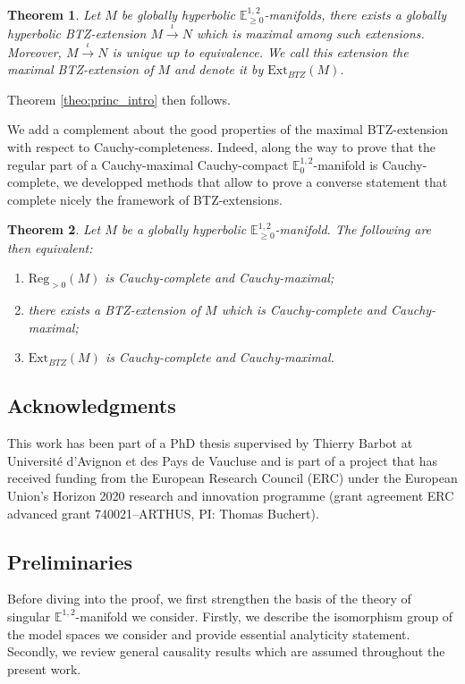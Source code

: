 \documentclass[a4paper,12pt]{article}
\newcommand{\mass}[1]{{\mathbb E}^{1,2}_{#1}}
\def\Reg{\mathrm{Reg}}
\def\BTZext{\mathrm{Ext}_{BTZ}}
\def\reg{\Reg}
\newtheorem{theo}{Theorem}    %
\begin{document}
 \begin{theo}\label{btzthm:globally_hyperbolic_manifolds_exists} Let $M$ be globally hyperbolic $\mass{\geq 0}$-manifolds, there exists a globally hyperbolic BTZ-extension $M\xrightarrow{\iota} N$ which is maximal among such extensions. Moreover, $M\xrightarrow{\iota}N$ is unique up to equivalence. We  call this extension
the maximal BTZ-extension of $M$ and denote it by 
  $\mathrm{Ext}_{BTZ}(M)$.   
\end{theo}
 Theorem \ref{theo:princ_intro} then follows. 

We add a complement about the good properties of the maximal BTZ-extension with respect to Cauchy-completeness. Indeed, along the way to prove that the regular part of a Cauchy-maximal Cauchy-compact $\mass{0}$-manifold is Cauchy-complete, we developped methods that allow to prove a converse statement that complete nicely the framework of BTZ-extensions. 

	\begin{theo}\label{btzthm:BTZ_Cauchy-completness_intro} \label{theo:BTZ_Cauchy-completness_intro}
				Let $M$ be a globally hyperbolic $\mass{\geq0}$-manifold. The following are then equivalent:			
				\begin{enumerate}
				\item $\reg_{>0}(M)$ is Cauchy-complete and Cauchy-maximal;
				\item there exists a BTZ-extension of $M$ which is Cauchy-complete and Cau\-chy-maximal;
				\item $\BTZext(M)$ is Cauchy-complete and Cauchy-maxi\-mal.
				\end{enumerate}
				\end{theo}

\subsection{Acknowledgments}
This work has been part of a PhD thesis supervised by Thierry Barbot  at Université d'Avignon et des Pays de Vaucluse and is part of a project that has received funding from the European Research Council (ERC) under the European Union's Horizon 2020 research and innovation programme (grant agreement ERC advanced grant 740021--ARTHUS, PI: Thomas Buchert). 



\subsection{Preliminaries}
Before diving into the proof, we first strengthen the basis of the theory of singular $\mass{}$-manifold we consider. Firstly, we describe the isomorphism group of the model spaces we consider and provide essential analyticity statement. Secondly, we review general causality results which are assumed throughout the present work.
\end{document}
